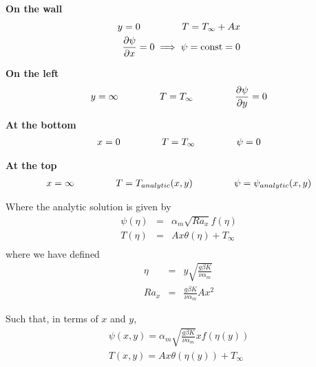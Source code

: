 \documentclass{article}
\begin{document}
\textbf{On the wall} 
\begin{eqnarray}
y=0 \hspace{10ex} T = T_\infty + A x\\ 
\frac{\partial \psi}{\partial x} = 0 \implies \psi = \text{const} = 0
\end{eqnarray}

\textbf{On the left}
\begin{eqnarray}
y = \infty \hspace{10ex} T = T_\infty \hspace{10ex} \frac{\partial \psi}{\partial y} = 0
\end{eqnarray}

\textbf{At the bottom}
\begin{eqnarray}
x = 0 \hspace{10ex} T = T_\infty \hspace{10ex} \psi = 0
\end{eqnarray}

\textbf{At the top}
\begin{eqnarray}
x= \infty  \hspace{10ex} T = T_{analytic}(x, y) \hspace{10ex} \psi = \psi_{analytic}(x, y)
\end{eqnarray}

Where the analytic solution is given by
\begin{eqnarray}
\psi(\eta) &=& \alpha_m \sqrt{Ra_x} f(\eta) \\
T(\eta) &=& A x \theta(\eta) + T_\infty \\
\end{eqnarray}
where we have defined
\begin{eqnarray}
\eta &=& y \sqrt{\frac{g \beta K}{\nu \alpha_m}} \label{eq:y-eta}\\
Ra_x &=& \frac{g \beta K}{\nu \alpha_m} A x^2
\end{eqnarray}

Such that, in terms of $x$ and $y$, 
\begin{eqnarray}
\psi(x,y) = \alpha_m \sqrt{\frac{g \beta K}{\nu \alpha_m}} x f(\eta(y)) \\
T(x, y) = A x \theta(\eta(y)) + T_\infty
\end{eqnarray}
\end{document}
